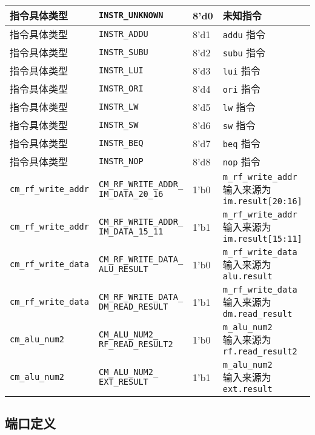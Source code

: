 \documentclass[12pt,AutoFakeBold]{article}
\begin{document}
\begin{longtable}[]{@{}|l|l|l|l|@{}}
指令具体类型 & \texttt{INSTR\_UNKNOWN} & 8'd0 & 未知指令\tabularnewline\hline
指令具体类型 & \texttt{INSTR\_ADDU} & 8'd1 & \texttt{addu}
指令\tabularnewline\hline
指令具体类型 & \texttt{INSTR\_SUBU} & 8'd2 & \texttt{subu}
指令\tabularnewline\hline
指令具体类型 & \texttt{INSTR\_LUI} & 8'd3 & \texttt{lui}
指令\tabularnewline\hline
指令具体类型 & \texttt{INSTR\_ORI} & 8'd4 & \texttt{ori}
指令\tabularnewline\hline
指令具体类型 & \texttt{INSTR\_LW} & 8'd5 & \texttt{lw}
指令\tabularnewline\hline
指令具体类型 & \texttt{INSTR\_SW} & 8'd6 & \texttt{sw}
指令\tabularnewline\hline
指令具体类型 & \texttt{INSTR\_BEQ} & 8'd7 & \texttt{beq}
指令\tabularnewline\hline
指令具体类型 & \texttt{INSTR\_NOP} & 8'd8 & \texttt{nop}
指令\tabularnewline\hline
\texttt{cm\_rf\_write\_addr} &
\makecell{\texttt{CM\_RF\_WRITE\_ADDR\_}\\\texttt{IM\_DATA\_20\_16}} & 1'b0 &
\makecell{\texttt{m\_rf\_write\_addr} \\输入来源为 \texttt{im.result{[}20:16{]}}}\tabularnewline\hline
\texttt{cm\_rf\_write\_addr} & \makecell{\texttt{CM\_RF\_WRITE\_ADDR\_}\\\texttt{IM\_DATA\_15\_11}} & 1'b1 & \makecell{\texttt{m\_rf\_write\_addr} \\输入来源为
\texttt{im.result{[}15:11{]}}}\tabularnewline\hline
\texttt{cm\_rf\_write\_data} & \makecell{\texttt{CM\_RF\_WRITE\_DATA\_}\\\texttt{ALU\_RESULT}}
& 1'b0 & \makecell{\texttt{m\_rf\_write\_data} \\输入来源为
\texttt{alu.result}}\tabularnewline\hline
\texttt{cm\_rf\_write\_data} &
\makecell{\texttt{CM\_RF\_WRITE\_DATA\_}\\\texttt{DM\_READ\_RESULT}} & 1'b1 &
\makecell{\texttt{m\_rf\_write\_data} \\输入来源为
\texttt{dm.read\_result}}\tabularnewline\hline
\texttt{cm\_alu\_num2} & \makecell{\texttt{CM\_ALU\_NUM2\_}\\\texttt{RF\_READ\_RESULT2}} &
1'b0 & \makecell{\texttt{m\_alu\_num2} \\输入来源为
\texttt{rf.read\_result2}}\tabularnewline\hline
\texttt{cm\_alu\_num2} & \makecell{\texttt{CM\_ALU\_NUM2\_}\\\texttt{EXT\_RESULT}} & 1'b1 &
\makecell{\texttt{m\_alu\_num2} \\输入来源为 \texttt{ext.result}}\tabularnewline\hline

\end{longtable}

\hypertarget{ux7aefux53e3ux5b9aux4e49-6}{%
\subsection{端口定义}\label{ux7aefux53e3ux5b9aux4e49-6}}
\end{document}
